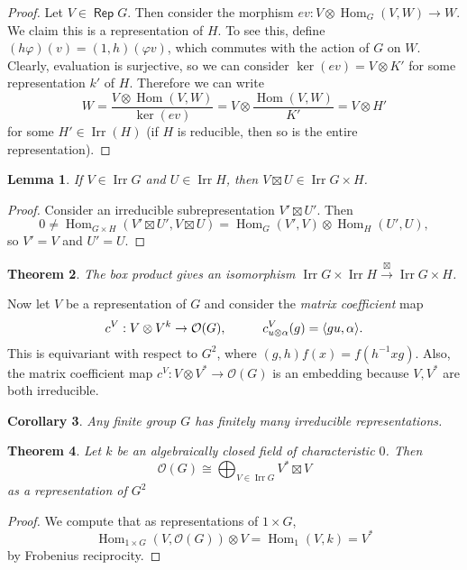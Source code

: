 \documentclass[leqno, openany]{memoir}
\DeclarePairedDelimiter{\gen}{\langle}{\rangle}
\newtheorem{thm}{Theorem}[chapter]
\newtheorem{cor}[thm]{Corollary}
\newtheorem{lem}[thm]{Lemma}
\theoremstyle{definition}
\theoremstyle{remark}
\theoremstyle{plain}
\theoremstyle{definition}
\theoremstyle{remark}
\newcommand{\mc}[1]{\mathcal{#1}}
\DeclareMathOperator{\Irr}{\mathrm{Irr}}
\DeclareMathOperator{\Rep}{\mathsf{Rep}}
\DeclareMathOperator{\Hom}{Hom}
\begin{document}
\begin{proof}
    Let $V \in \Rep G$. Then consider the morphism $ev: V \otimes \Hom_G(V, W) \to W$. We claim this is a representation of $H$. To see this, define $(h \varphi)(v) = (1,h)(\varphi v)$, which commutes with the action of $G$ on $W$. Clearly, evaluation is surjective, so we can consider $\ker(ev) = V \otimes K'$ for some representation $k'$ of $H$. Therefore we can write
    \[ W = \frac{V \otimes \Hom(V, W)}{\ker(ev)} = V \otimes \frac{\Hom(V, W)}{K'} = V \otimes H' \]
    for some $H' \in \Irr(H)$ (if $H$ is reducible, then so is the entire representation).
\end{proof}

\begin{lem}
    If $V \in \Irr G$ and $U \in \Irr H$, then $V \boxtimes U \in \Irr G \times H$.
\end{lem}

\begin{proof}
    Consider an irreducible subrepresentation $V' \boxtimes U'$. Then 
    \[ 0 \neq \Hom_{G \times H}(V' \boxtimes U', V \boxtimes U) = \Hom_G(V',V) \otimes \Hom_H(U', U), \]
    so $V' = V$ and $U' = U$.
\end{proof}

\begin{thm}
    The box product gives an isomorphism $\Irr G \times \Irr H \xrightarrow{\boxtimes} \Irr G \times H$.
\end{thm}

Now let $V$ be a representation of $G$ and consider the \textit{matrix coefficient} map
\[ c^V: V \otimes V^k \to \mc{O}(G), \hspace{1cm} c^V_{u \otimes \alpha}(g) = \gen{gu, \alpha}. \]
This is equivariant with respect to $G^2$, where $(g,h)f(x) = f(h^{-1}xg)$. Also, the matrix coefficient map $c^V: V \otimes V^* \to \mc{O}(G)$ is an embedding because $V, V^*$ are both irreducible.

\begin{cor}
    Any finite group $G$ has finitely many irreducible representations.
\end{cor}

\begin{thm}
    Let $k$ be an algebraically closed field of characteristic $0$. Then
    \[ \mc{O}(G) \cong \bigoplus_{V \in \Irr G} V^* \boxtimes V \]
    as a representation of $G^2$
\end{thm}

\begin{proof}
    We compute that as representations of $1 \times G$,
    \[ \Hom_{1 \times G}(V, \mc{O}(G)) \otimes V = \Hom_1(V, k) = V^* \]
    by Frobenius reciprocity. 
\end{proof}
\end{document}

